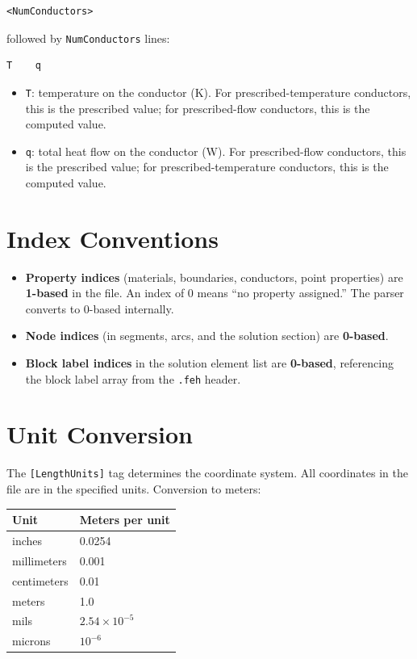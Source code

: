 \documentclass[11pt]{article}
\begin{document}
\begin{lstlisting}
<NumConductors>
\end{lstlisting}

followed by \texttt{NumConductors} lines:

\begin{lstlisting}
T    q
\end{lstlisting}

\begin{itemize}[nosep]
  \item \texttt{T}: temperature on the conductor (K).  For
        prescribed-temperature conductors, this is the prescribed
        value; for prescribed-flow conductors, this is the computed
        value.
  \item \texttt{q}: total heat flow on the conductor (W).  For
        prescribed-flow conductors, this is the prescribed value; for
        prescribed-temperature conductors, this is the computed value.
\end{itemize}

\section{Index Conventions}

\begin{itemize}
  \item \textbf{Property indices} (materials, boundaries, conductors,
        point properties) are \textbf{1-based} in the file.  An index
        of 0 means ``no property assigned.''  The parser converts to
        0-based internally.

  \item \textbf{Node indices} (in segments, arcs, and the solution
        section) are \textbf{0-based}.

  \item \textbf{Block label indices} in the solution element list are
        \textbf{0-based}, referencing the block label array from the
        \texttt{.feh} header.
\end{itemize}

\section{Unit Conversion}

The \verb|[LengthUnits]| tag determines the coordinate system.  All
coordinates in the file are in the specified units.  Conversion to
meters:

\begin{center}
\begin{tabular}{ll}
\toprule
Unit & Meters per unit \\
\midrule
inches      & 0.0254 \\
millimeters & 0.001 \\
centimeters & 0.01 \\
meters      & 1.0 \\
mils        & $2.54 \times 10^{-5}$ \\
microns     & $10^{-6}$ \\
\bottomrule
\end{tabular}
\end{center}
\end{document}
